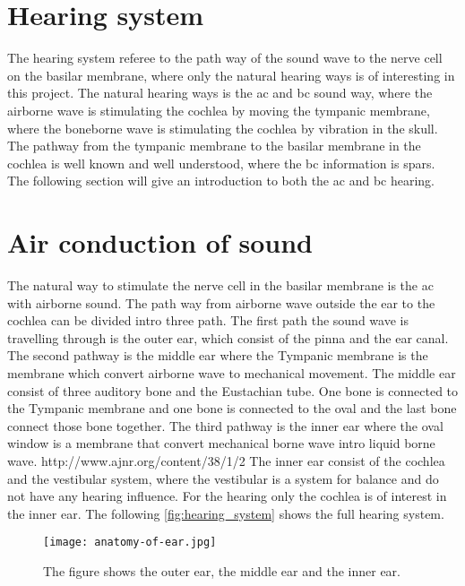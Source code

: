 \section{Hearing system}
The hearing system referee to the path way of the sound wave to the nerve cell on the basilar membrane, where only the natural hearing ways is of interesting in this project. The natural hearing ways is the \gls{ac} and \gls{bc} sound way, where the airborne wave is stimulating the cochlea by moving the tympanic membrane, where the boneborne wave is stimulating the cochlea by vibration in the skull. The pathway from the tympanic membrane to the basilar membrane in the cochlea is well known and well understood, where the \gls{bc} information is spars. The following section will give an introduction to both the \gls{ac} and \gls{bc} hearing.


\section{Air conduction of sound}
The natural way to stimulate the nerve cell in the basilar membrane is the \gls{ac} with airborne sound. The path way from airborne wave outside the ear to the cochlea can be divided intro three path. The first path the sound wave is travelling through is the outer ear, which consist of the pinna and the ear canal. The second pathway is the middle ear where the Tympanic membrane is the membrane which convert airborne wave to mechanical movement. The middle ear consist of three auditory bone and the Eustachian tube. One bone is connected to the Tympanic membrane and one bone is connected to the oval and the last bone connect those bone together. The third pathway is the inner ear where the oval window is a membrane that convert mechanical borne wave intro liquid borne wave. http://www.ajnr.org/content/38/1/2 The inner ear consist of the cochlea and the vestibular system, where the vestibular is a system for balance and do not have any hearing influence. For the hearing only the cochlea is of interest in the inner ear. The following \autoref{fig:hearing_system} shows the full hearing system.


 \begin{figure}[H]
	\centering
		\texttt{[image: anatomy-of-ear.jpg]}
		\caption{The figure shows the outer ear, the middle ear and the inner ear.}
		\label{fig:hearing_system}
\end{figure}

